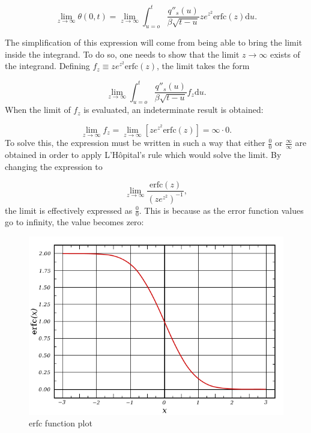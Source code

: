 \documentclass{article}
\begin{document}
\begin{equation}
    \lim_{z\rightarrow\infty} \theta(0,t) = \lim_{z\rightarrow\infty} \int_{u=o}^t \frac{q''_s(u)}{\beta\sqrt{t-u}} ze^{z^2} \text{erfc}(z)\text{d}u.
    \label{taketolimit}
\end{equation}

\newline 
The simplification of this expression will come from being able to bring the limit inside the integrand. To do so, one needs to show that the limit $z \rightarrow \infty$ exists of the integrand. %
Defining $f_z \equiv ze^{z^2} \text{erfc}(z)$, the limit takes the form

\begin{equation}
        \lim_{z\rightarrow\infty} \int_{u=o}^t \frac{q''_s(u)}{\beta\sqrt{t-u}} f_z \text{d}u.
\end{equation}
When the limit of $f_z$ is evaluated, an indeterminate result is obtained:

\begin{equation}
    \lim_{z\rightarrow\infty}f_z = \lim_{z\rightarrow\infty}[ ze^{z^2} \text{erfc}(z)] = \infty \cdot 0.
\end{equation}
To solve this, the expression must be written in such a way that either $\frac{0}{0} $ or $\frac{\infty}{\infty} $ are obtained in order to apply L’Hôpital’s rule which would solve the limit. By changing the expression to 

\begin{equation}
    \lim_{z\rightarrow\infty}\frac{ \text{erfc}(z)}{ (ze^{z^2})^{-1}},
\end{equation}
the limit is effectively expressed as $\frac{0}{0} $. This is because as the error function values go to infinity, the value becomes zero:

\begin{figure}[h]
    \centering
    \includegraphics[width=9cm\textwidth]{erfcplot}
    \caption{erfc function plot}
    \label{erfcplot}
\end{figure}
\end{document}
